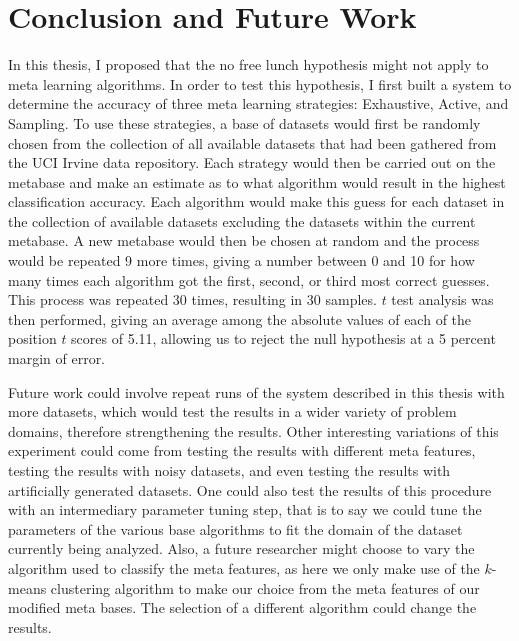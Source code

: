 \chapter{Conclusion and Future Work}
\label{Chapter5}
In this thesis, I proposed that the no free lunch hypothesis might not apply to
meta learning algorithms. In order to test this hypothesis, I first built a
system to determine the accuracy of three meta learning strategies:
Exhaustive, Active, and Sampling. To use these strategies, a base of
datasets would first be randomly chosen from the collection of all available
datasets that had been gathered from the UCI Irvine data repository.
Each strategy would then be carried out on the metabase and make an
estimate as to what algorithm would result in the highest classification
accuracy. Each algorithm would make this guess for each dataset in the
collection of available datasets excluding the datasets within the current
metabase. A new metabase would then be chosen at random and the process would be
repeated 9 more times, giving a number between 0 and 10 for how many times
each algorithm got the first, second, or third most correct guesses.
This process was repeated 30 times, resulting in 30 samples. $t$ test analysis
was then performed, giving an average among the absolute values of each of
the position $t$ scores of 5.11, allowing us to reject the null
hypothesis at a 5 percent margin of error.

Future work could involve repeat runs of the system described in this thesis
with more datasets, which would test the results in a wider variety of problem
domains, therefore strengthening the results. Other interesting variations of
this experiment could come from testing the results with different meta features,
testing the results with noisy datasets, and even testing the results with
artificially generated datasets. One could also test the results of this
procedure with an intermediary parameter tuning step, that is to say
we could tune the parameters of the various base algorithms to fit the domain
of the dataset currently being analyzed. Also, a future researcher might
choose to vary the algorithm used to classify the meta features, as here we
only make use of the $k$-means clustering algorithm to make our choice from the meta
features of our modified meta bases. The selection of a different algorithm
could change the results.
